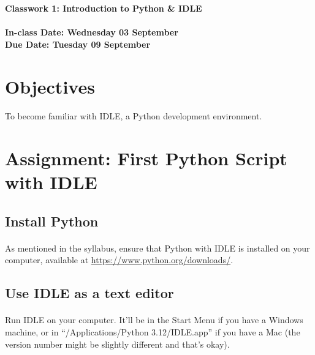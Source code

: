 \documentclass[letter,10pt]{article}
\begin{document}
    \huge
    \textbf{Classwork 1: Introduction to Python \& IDLE}
    \normalsize
    \\ ~~ \\
    \textbf{In-class Date: Wednesday 03 September} \\
    \textbf{Due Date: Tuesday 09 September}
    
    \section*{Objectives}
    \paragraph{}To become familiar with IDLE, a Python development environment.
    
    \section*{Assignment: First Python Script with IDLE}
    \subsection{Install Python}
    \paragraph{}As mentioned in the syllabus, ensure that Python with IDLE is installed on your computer, available at \url{https://www.python.org/downloads/}.
    
    \subsection{Use IDLE as a text editor}
    \paragraph{}Run IDLE on your computer. It'll be in the Start Menu if you have a Windows machine, or in ``/Applications/Python 3.12/IDLE.app'' if you have a Mac (the version number might be slightly different and that's okay).
    
\end{document}

